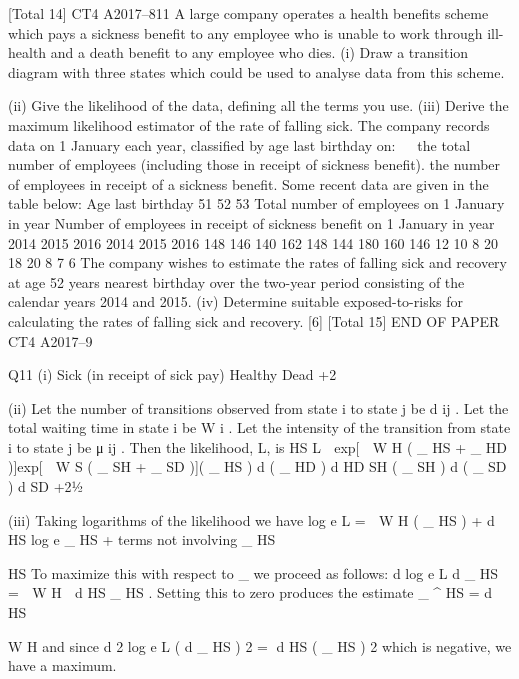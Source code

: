 \documentclass[a4paper,12pt]{article}
\begin{document}
[Total 14]
CT4 A2017–811
A large company operates a health benefits scheme which pays a sickness benefit to
any employee who is unable to work through ill-health and a death benefit to any
employee who dies.
(i) Draw a transition diagram with three states which could be used to analyse
data from this scheme.

(ii) Give the likelihood of the data, defining all the terms you use. 
(iii) Derive the maximum likelihood estimator of the rate of falling sick. 
The company records data on 1 January each year, classified by age last birthday on:


the total number of employees (including those in receipt of sickness benefit).
the number of employees in receipt of a sickness benefit.
Some recent data are given in the table below:
Age last
birthday
51
52
53
Total number of employees
on 1 January in year
Number of employees in receipt of
sickness benefit on 1 January in year
2014 2015 2016 2014 2015 2016
148
146
140 162
148
144 180
160
146 12
10
8 20
18
20 8
7
6
The company wishes to estimate the rates of falling sick and recovery at age 52 years
nearest birthday over the two-year period consisting of the calendar years 2014 and
2015.
(iv)
Determine suitable exposed-to-risks for calculating the rates of falling sick and
recovery.
[6]
[Total 15]
END OF PAPER
CT4 A2017–9

Q11
(i)
Sick (in receipt of
sick pay)
Healthy
Dead
+2

(ii)
Let the number of transitions observed from state i to state j be d ij . 
Let the total waiting time in state i be W i . 
Let the intensity of the transition from state i to state j be μ ij . 
Then the likelihood, L, is
HS
L  exp[  W H ( \mu_ HS + \mu_ HD )]exp[  W S ( \mu_ SH + \mu_ SD )]( \mu_ HS ) d ( \mu_ HD ) d
HD
SH
( \mu_ SH ) d ( \mu_ SD ) d
SD
+21⁄2

(iii)
Taking logarithms of the likelihood we have
log e L \;=\;  W H ( \mu_ HS ) + d HS log e \mu_ HS + terms not involving \mu_ HS

HS
To maximize this with respect to \mu_ we proceed as follows:
d log e L
d \mu_ HS
\;=\;  W
H

d HS
\mu_ HS
.
Setting this to zero produces the estimate
\mu_
^
HS
\;=\;
d HS



W H
and since
d 2 log e L
( d \mu_ HS ) 2
\;=\;
d HS
( \mu_ HS ) 2
which is negative, we have a maximum.
\end{document}
